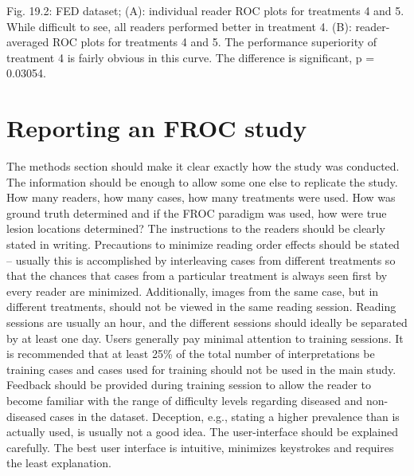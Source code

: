 \documentclass[
]{book}
\begin{document}
Fig. 19.2: FED dataset; (A): individual reader ROC plots for treatments 4 and 5. While difficult to see, all readers performed better in treatment 4. (B): reader-averaged ROC plots for treatments 4 and 5. The performance superiority of treatment 4 is fairly obvious in this curve. The difference is significant, p = 0.03054.

\hypertarget{analyzing-froc-data-reporting}{%
\section{Reporting an FROC study}\label{analyzing-froc-data-reporting}}

The methods section should make it clear exactly how the study was conducted. The information should be enough to allow some one else to replicate the study. How many readers, how many cases, how many treatments were used. How was ground truth determined and if the FROC paradigm was used, how were true lesion locations determined? The instructions to the readers should be clearly stated in writing. Precautions to minimize reading order effects should be stated -- usually this is accomplished by interleaving cases from different treatments so that the chances that cases from a particular treatment is always seen first by every reader are minimized. Additionally, images from the same case, but in different treatments, should not be viewed in the same reading session. Reading sessions are usually an hour, and the different sessions should ideally be separated by at least one day. Users generally pay minimal attention to training sessions. It is recommended that at least 25\% of the total number of interpretations be training cases and cases used for training should not be used in the main study. Feedback should be provided during training session to allow the reader to become familiar with the range of difficulty levels regarding diseased and non-diseased cases in the dataset. Deception, e.g., stating a higher prevalence than is actually used, is usually not a good idea. The user-interface should be explained carefully. The best user interface is intuitive, minimizes keystrokes and requires the least explanation.
\end{document}
